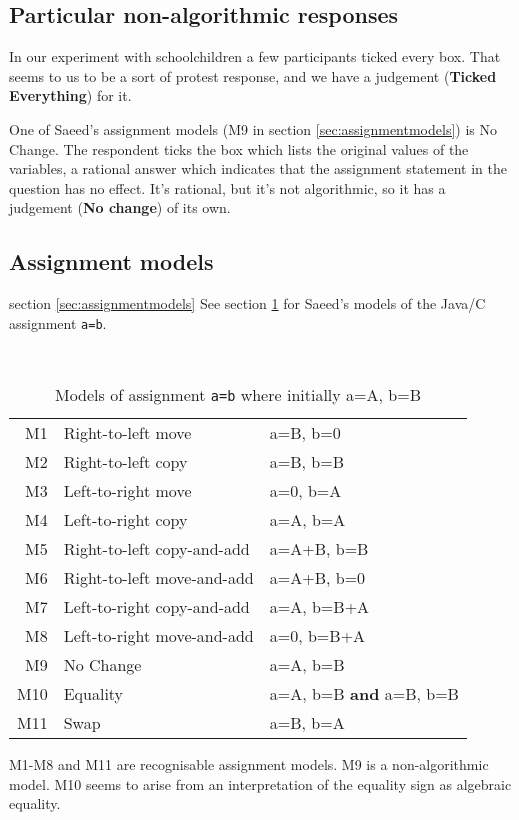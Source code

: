 \documentclass[11pt,a4paper]{article}
\newcommand{\secref}[1]{section \ref{sec:#1}}
\newcommand{\tablabel}[1]{\label{tab:#1}}
\newcommand{\tabref}[1]{section \ref{tab:#1}}
\newcommand{\vstrut}[1]{\rule{0pt}{#1}}
\begin{document}
\subsection{Particular non-algorithmic responses}

In our experiment with schoolchildren a few participants ticked every box. That seems to us to be a sort of protest response, and we have a judgement (\textbf{Ticked Everything}) for it.

One of Saeed's assignment models (M9 in \secref{assignmentmodels}) is No Change. The respondent ticks the box which lists the original values of the variables, a rational answer which indicates that the assignment statement in the question has no effect. It's rational, but it's not algorithmic, so it has a judgement (\textbf{No change}) of its own.

\subsection{Assignment models}
\secref{assignmentmodels}
See \tabref{assignmentmodels} for Saeed's models of the Java/C assignment \texttt{a=b}.

\begin{table}
\caption{Models of assignment \texttt{a=b} where initially a=A, b=B}
\centering
\vstrut{2pt}\\
\begin{tabular}{|r|l|l|}
\hline
M1 & Right-to-left move & a=B, b=0 \\
M2 & Right-to-left copy & a=B, b=B \\
M3 & Left-to-right move & a=0, b=A \\
M4 & Left-to-right copy & a=A, b=A \\
M5 & Right-to-left copy-and-add & a=A+B, b=B \\
M6 & Right-to-left move-and-add & a=A+B, b=0 \\
M7 & Left-to-right copy-and-add & a=A, b=B+A \\
M8 & Left-to-right move-and-add & a=0, b=B+A \\
\hline
M9 & No Change & a=A, b=B \\
M10 & Equality & a=A, b=B \textbf{and} a=B, b=B \\ 
\hline
M11 & Swap & a=B, b=A \\
\hline
\end{tabular}
\tablabel{assignmentmodels}
\end{table}

M1-M8 and M11 are recognisable assignment models. M9 is a non-algorithmic model. M10 seems to arise from an interpretation of the equality sign as algebraic equality. 
\end{document}
